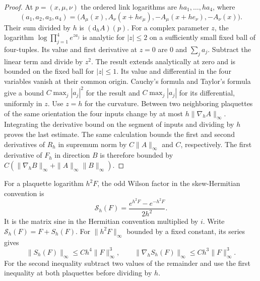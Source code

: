 \documentclass[11pt,letterpaper,reqno]{amsart}
\numberwithin{equation}{section}
\theoremstyle{definition}
\theoremstyle{remark}
\begin{document}
\begin{proof}
At \(p=(x,\mu,\nu)\) the ordered link logarithms are \(ha_1,\ldots,ha_4\),
where
\[
 (a_1,a_2,a_3,a_4)
 =\bigl(A_\mu(x),A_\nu(x+he_\mu),
                      -A_\mu(x+he_\nu),-A_\nu(x)\bigr).
\]
Their sum divided by \(h\) is \((\mathrm d_h A)(p)\).
For a complex parameter \(z\), the logarithm
\(\log\prod_{j=1}^4 e^{za_j}\) is analytic for \(|z|\leq2\) on
a sufficiently small fixed ball of four-tuples. Its value and
first derivative at \(z=0\) are \(0\) and \(\sum_j a_j\).
Subtract the linear term and divide by \(z^2\). The result extends
analytically at zero and is bounded on the fixed ball for
\(|z|\leq1\). Its value and differential in the four variables
vanish at their common origin. Cauchy's formula and Taylor's
formula give a bound \(C\max_j|a_j|^2\) for the result and
\(C\max_j|a_j|\) for its differential, uniformly in \(z\).
Use \(z=h\) for the curvature. Between two neighboring plaquettes
of the same orientation the four inputs change by at most
\(h\|\nabla_h A\|_\infty\). Integrating the derivative bound on
the segment of inputs and dividing by \(h\) proves the last
estimate. The same calculation bounds the first and second
derivatives of \(R_h\) in supremum norm by \(C\|A\|_\infty\)
and \(C\), respectively. The first derivative of \(F_h\) in
direction \(B\) is therefore bounded by
\(C(\|\nabla_h B\|_\infty+\|A\|_\infty\|B\|_\infty)\).
\end{proof}

For a plaquette logarithm \(h^2F\), the odd Wilson factor in the
skew-Hermitian convention is
\[
 \mathcal S_h(F)=\frac{e^{h^2F}-e^{-h^2F}}{2h^2}.
\]
It is the matrix sine in the Hermitian convention multiplied by \(i\).
Write \(\mathcal S_h(F)=F+S_h(F)\). For \(\|h^2F\|_\infty\) bounded
by a fixed constant, its series gives
\begin{equation}\label{eq:wilson-sine-remainder}
 \|S_h(F)\|_\infty\leq C h^4\|F\|_\infty^3,\qquad
 \|\nabla_h S_h(F)\|_\infty\leq C h^3\|F\|_\infty^3 .
\end{equation}
For the second inequality subtract two values of the remainder
and use the first inequality at both plaquettes before dividing
by \(h\).
\end{document}
